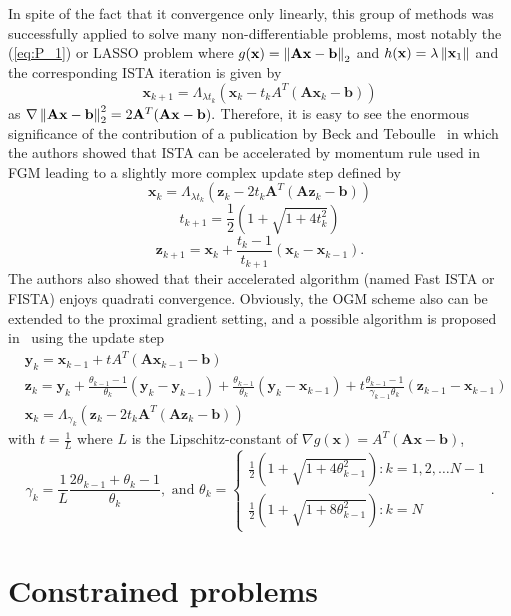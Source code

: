 In spite of the fact that it convergence only linearly, this group of methods was successfully applied to solve many non-differentiable problems, most notably the (\ref{eq:P_1}) or LASSO problem where $g(\mathbf{x}) = \left\lVert\mathbf{Ax - b}\right\rVert_2$ and $h(\mathbf{x}) = \lambda \left\lVert\mathbf{x}_1\right\rVert$ and the corresponding ISTA iteration is given by
\[\mathbf{x}_{k+1} = \Lambda_{\lambda t_k}(\mathbf{x}_k - t_k A^T(\mathbf{Ax}_k - \mathbf{b}))\]
as $\nabla \left\lVert\mathbf{Ax - b}\right\rVert_2^2 = 2 \mathbf{A}^T(\mathbf{Ax} - \mathbf{b}).$ Therefore, it is easy to see the enormous significance of the contribution of a publication by Beck and Teboulle~\cite{beck_fast_2009} in which the authors showed that ISTA can be accelerated by momentum rule used in FGM leading to a slightly more complex update step defined by
\[\mathbf{x}_k = \Lambda_{\lambda t_k}(\mathbf{z}_k - 2t_k \mathbf{A}^T(\mathbf{Az}_k - \mathbf{b}))\]
\[t_{k+1} = \frac{1}{2}\left(1 + \sqrt{1 + 4t_k^2}\right)\]
\[\mathbf{z}_{k+1} = \mathbf{x}_k + \frac{t_k - 1}{t_{k+1}}(\mathbf{x}_k - \mathbf{x}_{k-1}).\]
The authors also showed that their accelerated algorithm (named Fast ISTA or FISTA) enjoys quadrati convergence. Obviously, the OGM scheme also can be extended to the proximal gradient setting, and a possible algorithm is proposed in~\cite{taylor_smooth_2017} using the update step
\begin{align*}
    & \mathbf{y}_k = \mathbf{x}_{k-1} + t A^T(\mathbf{Ax}_{k-1} - \mathbf{b})\\
    & \mathbf{z}_k = \mathbf{y}_k
        + \frac{\theta_{k-1} - 1}{\theta_k}(\mathbf{y}_k - \mathbf{y}_{k-1})
        + \frac{\theta_{k-1}}{\theta_k}(\mathbf{y}_k - \mathbf{x}_{k-1})
        + t \frac{\theta_{k-1} - 1}{\gamma_{k-1}\theta_k}(\mathbf{z}_{k-1} - \mathbf{x}_{k-1})\\
    & \mathbf{x}_k = \Lambda_{\gamma_k}(\mathbf{z}_k - 2t_k \mathbf{A}^T(\mathbf{Az}_k - \mathbf{b}))
\end{align*}
with $t = \frac{1}{L}$ where $L$ is the Lipschitz-constant of $\nabla g(\mathbf{x}) = A^T(\mathbf{Ax} - \mathbf{b})$, \[\gamma_k = \frac{1}{L}\frac{2\theta_{k-1} + \theta_k - 1}{\theta_k}, \text{ and }
\theta_k = \begin{cases}
            \frac{1}{2}\left(1 + \sqrt{1 + 4\theta_{k-1}^2}\right) : k = 1, 2, \ldots N - 1\\
            \frac{1}{2}\left(1 + \sqrt{1 + 8\theta_{k-1}^2}\right) : k = N
        \end{cases}.\]

\section{Constrained problems}

